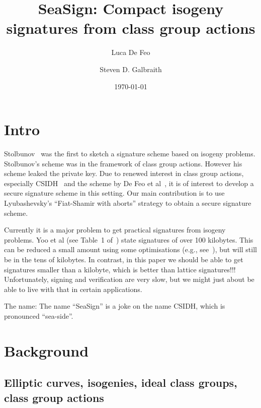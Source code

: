 \documentclass{llncs}
\title{SeaSign: Compact isogeny signatures from class group actions}
\author{Luca De Feo \and Steven D. Galbraith}
\institute{Mathematics Department, University of Auckland, NZ.
\email{s.galbraith@auckland.ac.nz}}
\date{\today}
\begin{document}
\pagestyle{plain}

\maketitle


\begin{abstract}

\end{abstract}



\section{Intro}

Stolbunov~\cite{Sto12} was the first to sketch a signature scheme based on isogeny problems.
Stolbunov's scheme was in the framework of class group actions.
However his scheme leaked the private key.
Due to renewed interest in class group actions, especially CSIDH~\cite{CLMPR18} and the scheme by De Feo et al~\cite{DFKS18}, it is of interest to develop a secure signature scheme in this setting.
Our main contribution is to use Lyubashevsky's ``Fiat-Shamir with aborts'' strategy to obtain a secure signature scheme.




Currently it is a major problem to get practical signatures from isogeny problems.
Yoo et al (see Table~1 of~\cite{YAJJS17}) state signatures of over 100 kilobytes.
This can be reduced a small amount using some optimisations (e.g., see~\cite{GPS17}), but will still be in the tens of kilobytes.
In contrast, in this paper we should be able to get signatures smaller than a kilobyte, which is better than lattice signatures!!!
Unfortunately, signing and verification are very slow, but we might just about be able to live with that in certain applications.


The name: The name ``SeaSign'' is a joke on the name CSIDH, which is pronounced ``sea-side''.




\section{Background}

\subsection{Elliptic curves, isogenies, ideal class groups, class group actions}
\end{document}
